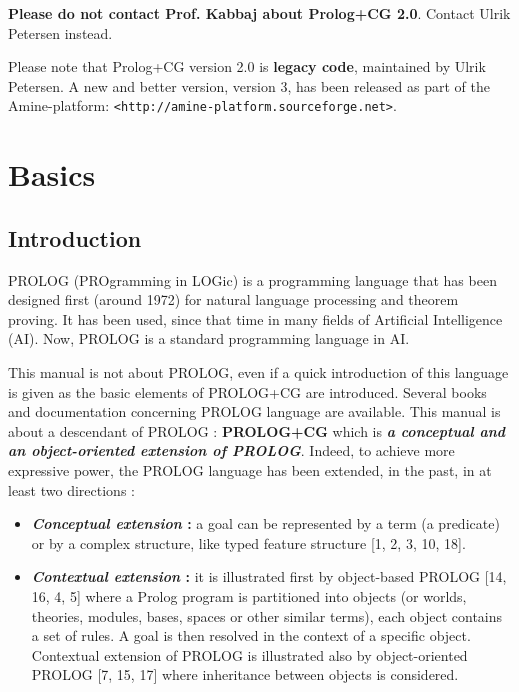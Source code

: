 \documentclass{book}
\begin{document}
{\bf Please do not contact Prof. Kabbaj about Prolog+CG 2.0}.  Contact
Ulrik Petersen instead.

Please note that Prolog+CG version 2.0 is {\bf legacy code},
maintained by Ulrik Petersen.  A new and better version, version 3,
has been released as part of the Amine-platform:
\texttt{<http://amine-platform.sourceforge.net>}.

\newpage

\chapter{Basics}

\section{Introduction}\label{Sec:Introduction}

PROLOG (PROgramming in LOGic) is a programming language that has been
designed first (around 1972) for natural language processing and
theorem proving. It has been used, since that time in many fields of
Artificial Intelligence (AI).  Now, PROLOG is a standard programming
language in AI.

This manual is not about PROLOG, even if a quick introduction of
this language is given as the basic elements of PROLOG+CG are
introduced. Several books and documentation concerning PROLOG language
are available. This manual is about a descendant of PROLOG :
{\bf PROLOG+CG} which is {\bf {\it a conceptual and an
object-oriented extension of PROLOG}}. Indeed, to achieve
more expressive power, the PROLOG language has been extended, in the
past, in at least two directions :

\begin{itemize}

\item {\bf {\it Conceptual extension} :} a goal can be
represented by a term (a predicate) or by a complex structure, like
typed feature structure [1, 2, 3, 10, 18].

\item {\bf {\it Contextual extension} :} it is illustrated
first by object-based PROLOG [14, 16, 4, 5] where a Prolog program is
partitioned into objects (or worlds, theories, modules, bases, spaces
or other similar terms), each object contains a set of rules. A goal
is then resolved in the context of a specific object. Contextual
extension of PROLOG is illustrated also by object-oriented PROLOG [7,
15, 17] where inheritance between objects is considered.

\end{itemize}
\end{document}

